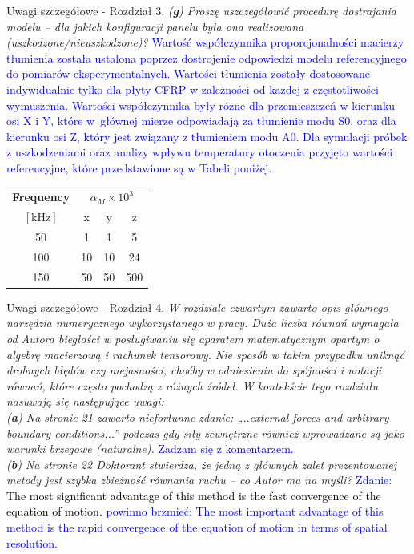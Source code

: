 \documentclass[10pt,aspectratio=169]{beamer} %
\begin{document}
\begin{frame}[label=frame2]{Uwagi szczegółowe - Rozdział 3.}\justifying
\textit{(\textbf{g}) Proszę uszczegółowić procedurę dostrajania modelu – dla jakich konfiguracji panelu była ona realizowana (uszkodzone/nieuszkodzone)?}	\textcolor{blue}{Wartość współczynnika proporcjonalności macierzy tłumienia została ustalona poprzez dostrojenie odpowiedzi modelu referencyjnego do pomiarów eksperymentalnych. Wartości tłumienia zostały dostosowane indywidualnie tylko dla płyty CFRP w zależności od każdej z częstotliwości wymuszenia. Wartości współczynnika były różne dla przemieszczeń w kierunku osi X i Y, które w~głównej mierze odpowiadają za tłumienie modu S0, oraz dla kierunku osi Z, który jest związany z tłumieniem modu A0. Dla symulacji próbek z uszkodzeniami oraz analizy wpływu temperatury otoczenia przyjęto wartości referencyjne, które przedstawione są w Tabeli poniżej.}
\begin{table}[!hbt]

	\tabcolsep=0.1cm

	\centering
	\begin{tabular}{cccc}

		\textbf{Frequency} & \multicolumn{3}{c}{\(\alpha_M\times 10^3\)} \\

		\([\mathrm{kHz}]\) & x & y & z\\\midrule

		50 & 1 & 1 & 5\\

		100 & 10 & 10 & 24\\

		150 & 50 & 50 & 500

	\end{tabular}

\end{table}
\end{frame}
\begin{frame}[label=frame4]{Uwagi szczegółowe - Rozdział 4.}\justifying
\textit{W rozdziale czwartym zawarto opis głównego narzędzia numerycznego wykorzystanego w 	pracy. Duża liczba równań wymagała od Autora biegłości w posługiwaniu się aparatem matematycznym opartym o algebrę macierzową i rachunek tensorowy. Nie sposób w takim przypadku uniknąć drobnych błędów czy niejasności, choćby w odniesieniu do spójności i	notacji równań, które często pochodzą z różnych źródeł. W kontekście tego rozdziału nasuwają się następujące uwagi:\\
(\textbf{a}) Na stronie 21 zawarto niefortunne zdanie: „..external forces and arbitrary boundary conditions...” podczas gdy siły zewnętrzne również wprowadzane są jako warunki	brzegowe (naturalne).} \textcolor{blue}{Zadzam się z komentarzem.}\\
\textit{(\textbf{b}) Na stronie 22 Doktorant stwierdza, że jedną z głównych zalet prezentowanej metody jest szybka zbieżność równania ruchu – co Autor ma na myśli?} \textcolor{blue}{Zdanie: \textcolor{black}{The most significant advantage of this method is the fast convergence of the equation of motion.} powinno brzmieć: The most important advantage of this method is the rapid convergence of the equation of motion in terms of spatial resolution.}
\end{frame}
\end{document}
